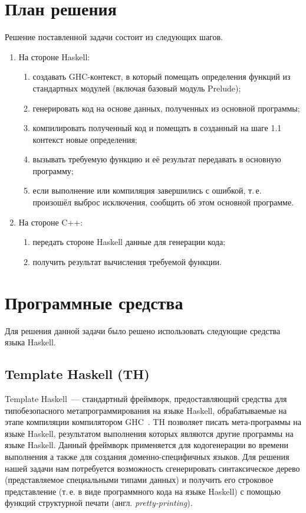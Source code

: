 \section{План решения}
Решение поставленной задачи состоит из следующих шагов.
\begin{enumerate}[1.]
	\item На стороне Haskell:
		\begin{enumerate}[1)]
			\item создавать GHC-контекст, в который помещать определения функций из стандартных модулей (включая базовый модуль Prelude);
			\item генерировать код на основе данных, полученных из основной программы;
			\item компилировать полученный код и помещать в созданный на шаге 1.1 контекст новые определения;
			\item вызывать требуемую функцию и её результат передавать в основную программу;
			\item если выполнение или компиляция завершились с ошибкой, т.\,е. произошёл выброс исключения, сообщить об этом основной программе.
		\end{enumerate}
	\item На стороне C++:
		\begin{enumerate}[1)]
			\item передать стороне Haskell данные для генерации кода;
			\item получить результат вычисления требуемой функции.
		\end{enumerate}
\end{enumerate}
\section{Программные средства}
Для решения данной задачи было решено использовать следующие средства языка Haskell.

	\subsection{Template Haskell (TH)}\label{temphassec} Template Haskell~--- стандартный фреймворк, предоставляющий средства для типобезопасного метапрограммирования на языке Haskell, обрабатываемые на этапе компиляции компилятором GHC~\autocite{temphas}. TH позволяет писать мета-программы на языке Haskell, результатом выполнения которых являются другие программы на языке Haskell. Данный фреймворк применяется для кодогенерации во времени выполнения а также для создания доменно-специфичных языков. Для решения нашей задачи нам потребуется возможность сгенерировать синтаксическое дерево (представляемое специальными типами данных) и получить его строковое представление (т.\,е. в виде программного кода на языке Haskell) с помощью функций структурной печати (англ. \textit{pretty-printing}).
	
